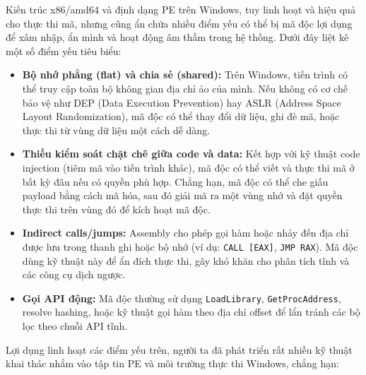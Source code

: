 Kiến trúc x86/amd64 và định dạng PE trên Windows, tuy linh hoạt và
hiệu quả cho thực thi mã, nhưng cũng ẩn chứa nhiều điểm yếu có thể
bị mã độc lợi dụng để xâm nhập, ẩn mình và hoạt động âm thầm trong
hệ thống. Dưới đây liệt kê một số điểm yếu tiêu biểu:

\begin{itemize}
    \item \textbf{Bộ nhớ phẳng (flat) và chia sẻ (shared):} Trên
        Windows, tiến trình có thể truy cập toàn bộ không gian địa chỉ
        ảo của mình. Nếu không có cơ chế bảo vệ như DEP (Data Execution
        Prevention) hay ASLR (Address Space Layout Randomization), mã
        độc có thể thay đổi dữ liệu, ghi đè mã, hoặc thực thi từ vùng
        dữ liệu một cách dễ dàng.

    \item \textbf{Thiếu kiểm soát chặt chẽ giữa code và data:} Kết
        hợp với kỹ thuật code injection (tiêm mã vào tiến trình khác),
        mã độc có thể viết và thực thi mã ở bất kỳ đâu nếu có quyền
        phù hợp. Chẳng hạn, mã độc có thể che giấu payload bằng cách
        mã hóa, sau đó giải mã ra một vùng nhớ và đặt quyền thực thi
        trên vùng đó để kích hoạt mã độc.

    \item \textbf{Indirect calls/jumps:} Assembly cho phép gọi hàm
        hoặc nhảy đến địa chỉ được lưu trong thanh ghi hoặc bộ nhớ
        (ví dụ: \texttt{CALL [EAX]}, \texttt{JMP RAX}). Mã độc dùng
        kỹ thuật này để ẩn đích thực thi, gây khó khăn cho phân tích
        tĩnh và các công cụ dịch ngược.

    \item \textbf{Gọi API động:} Mã độc thường sử dụng
        \texttt{LoadLibrary}, \texttt{GetProcAddress}, resolve hashing,
        hoặc kỹ thuật gọi hàm theo địa chỉ offset để lẩn tránh các bộ
        lọc theo chuỗi API tĩnh.
\end{itemize}

Lợi dụng linh hoạt các điểm yếu trên, người ta đã phát triển rất
nhiều kỹ thuật khai thác nhắm vào tập tin PE và môi trường thực thi
Windows, chẳng hạn:

